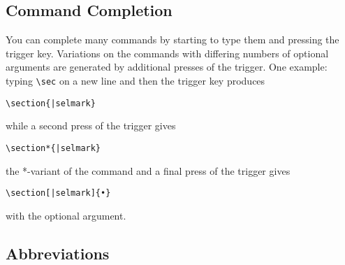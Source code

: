 \documentclass[11pt]{article}
\newcommand{\ctlkey}{\texttt{Ctl}}
\newcommand{\cmdkey}{\texttt{Cmd}}
\newcommand{\esckey}{\texttt{Esc}}
\newcommand{\mnu}[1]{\texttt{#1}}
\newcommand{\cmd}[1]{\texttt{#1}}
\newcommand{\To}{\,\(\to\)\,}
\newcommand{\selmark}{\colorbox{cyan}{\rule[-0.5ex]{0ex}{2.1ex}\texttt{•}}}
\newcommand{\TS}{\textsf{\TeX Shop}}
\begin{document}
\subsection*{Command Completion}

%

You can complete many commands by starting to type them and pressing the trigger key. Variations on the commands with differing numbers of optional arguments are generated by additional presses of the trigger. One example: typing \verb|\sec| on a new line and then the trigger key produces
\begin{verbatim}
\section{|selmark}
\end{verbatim}
while a second press of the trigger gives
\begin{verbatim}
\section*{|selmark}
\end{verbatim}
the *-variant of the command and a final press of the trigger gives
\begin{verbatim}
\section[|selmark]{•}
\end{verbatim}
with the optional argument.

\subsection*{Abbreviations}
\end{document}
